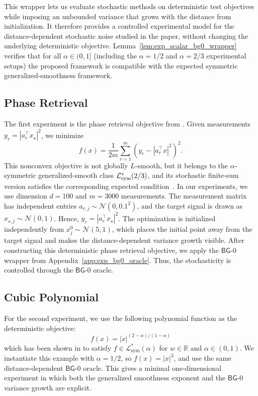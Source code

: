 \documentclass[letter,11pt]{article}
\begin{document}
This wrapper lets us evaluate stochastic methods on deterministic test objectives while imposing an unbounded variance that grows with the distance from initialization. It therefore provides a controlled experimental model for the distance-dependent stochastic noise studied in the paper, without changing the underlying deterministic objective. Lemma~\ref{lem:exp_scalar_bg0_wrapper} verifies that for all $\alpha\in(0,1]$ (including the $\alpha=1/2$ and $\alpha=2/3$ experimental setups) the proposed framework is compatible with the expected symmetric generalized-smoothness framework.


\subsection{Phase Retrieval}

The first experiment is the phase retrieval objective from \citet{chen2023generalized}. Given measurements
$y_r=|a_r^\top x_\star|^2$, we minimize
\[
f(x)=\frac{1}{2m}\sum_{r=1}^m \left(y_r-|a_r^\top x|^2\right)^2 .
\]
This nonconvex objective is not globally $L$-smooth, but it belongs to
the $\alpha$-symmetric generalized-smooth class
$\mathcal L_{\rm sym}^*(2/3)$, and its stochastic finite-sum version satisfies the corresponding expected condition~\citet{chen2023generalized}. In our experiments, we use dimension \(d=100\) and \(m=3000\) measurements. The measurement matrix has independent entries
\(a_{r,j}\sim\mathcal N(0,0.1^2)\), and the target signal is drawn as
\(x_{\star,j}\sim\mathcal N(0,1)\). Hence, $y_r=|a_r^\top x_\star|^2$. The optimization is initialized independently from $x^0_j\sim\mathcal N(5,1)$, which places the initial point away from the target signal and makes the distance-dependent variance growth visible. After constructing this deterministic phase retrieval objective, we apply the $\mathsf{BG}$-0 wrapper from Appendix~\ref{app:exp_bg0_oracle}. Thus, the stochasticity is controlled through the $\mathsf{BG}$-0 oracle.

\subsection{Cubic Polynomial}
For the second experiment, we use the following polynomial function as the deterministic objective:
\[
f(x)=|x|^{(2-\alpha)/(1-\alpha)}
\]
which has been shown in \citep{chen2023generalized} to satisfy $f\in\mathcal{L}_{\mathrm{sym}}^{*}(\alpha)$ for $w\in\mathbb{R}$ and $\alpha\in(0,1)$. We instantiate this example with $\alpha=1/2$, so $f(x)=|x|^3$, and use the same distance-dependent $\mathsf{BG}$-0 oracle. This gives a minimal one-dimensional experiment in which both the generalized smoothness exponent and the $\mathsf{BG}$-0 variance growth are explicit.
\end{document}
